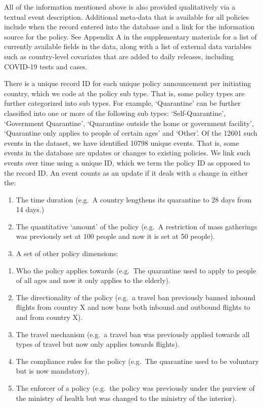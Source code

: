 \documentclass[]{article}
\providecommand{\tightlist}{%
  \setlength{\itemsep}{0pt}\setlength{\parskip}{0pt}}
\begin{document}
All of the information mentioned above is also provided qualitatively via a textual event description. Additional meta-data that is available for all policies include when the record entered into the database and a link for the information source for the policy. See Appendix A in the supplementary materials for a list of currently available fields in the data, along with a list of external data variables such as country-level covariates that are added to daily releases, including COVID-19 tests and cases.

There is a unique record ID for each unique policy announcement per initiating country, which we code at the policy sub type. That is, some policy types are further categorized into sub types. For example, `Quarantine' can be further classified into one or more of the following sub types: `Self-Quarantine', `Government Quarantine', `Quarantine outside the home or government facility', `Quarantine only applies to people of certain ages' and `Other'. Of the 12601 such events in the dataset, we have identified 10798 unique events. That is, some events in the database are updates or changes to existing policies. We link such events over time using a unique ID, which we term the policy ID as opposed to the record ID. An event counts as an update if it deals with a change in either the:

\begin{enumerate}
\def\labelenumi{\arabic{enumi}.}
\tightlist
\item
  The time duration (e.g.~A country lengthens its quarantine to 28 days from 14 days.)
\item
  The quantitative `amount' of the policy (e.g.~A restriction of mass gatherings was previously set at 100 people and now it is set at 50 people).
\item
  A set of other policy dimensions:
\end{enumerate}

\begin{enumerate}
\def\labelenumi{\alph{enumi}.}
\tightlist
\item
  Who the policy applies towards (e.g.~The quarantine used to apply to people of all ages and now it only applies to the elderly).
\item
  The directionality of the policy (e.g.~a travel ban previously banned inbound flights from country X and now bans both inbound and outbound flights to and from country X).
\item
  The travel mechanism (e.g.~a travel ban was previously applied towards all types of travel but now only applies towards flights).
\item
  The compliance rules for the policy (e.g.~The quarantine used to be voluntary but is now mandatory).
\item
  The enforcer of a policy (e.g.~the policy was previously under the purview of the ministry of health but was changed to the ministry of the interior).
\end{enumerate}
\end{document}
